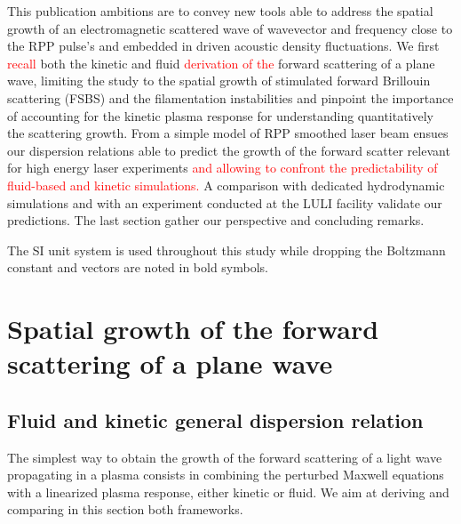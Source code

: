 \documentclass[
 reprint,
 superscriptaddress,
 amsmath,amssymb,
 aps,
]{revtex4-1}
\def\tc{\textcolor{red}}
\begin{document}
This publication ambitions are to convey new tools 
able to address  the spatial growth of an electromagnetic scattered wave of wavevector and frequency close to the RPP pulse's and embedded in driven acoustic density fluctuations.
We first \tc{recall} both the kinetic and fluid \tc{derivation of the} forward scattering of a plane wave, limiting the study to the spatial  growth of  stimulated forward Brillouin scattering (FSBS) and the filamentation instabilities and pinpoint the importance of accounting for the kinetic plasma response for understanding quantitatively the scattering growth.
From  a simple model of RPP smoothed laser beam ensues our dispersion relations  able to predict the growth of the forward scatter relevant for high energy laser experiments \tc{and allowing to confront the predictability of fluid-based and kinetic simulations.} 
A comparison with dedicated hydrodynamic simulations and with an experiment conducted at the LULI facility validate our predictions.
The last section gather our perspective and concluding remarks. 

The SI unit system is used throughout this study while dropping the Boltzmann constant and vectors are noted in bold symbols. 

\section{Spatial growth of the  forward scattering of a plane wave}\label{sec:plane}
\subsection{Fluid and kinetic general dispersion relation}
The simplest way to obtain the growth of the forward scattering of a light wave propagating in a plasma consists  in combining the perturbed Maxwell equations with a linearized plasma response, either kinetic or fluid.
We aim at deriving and comparing in this section both frameworks.
\end{document}
